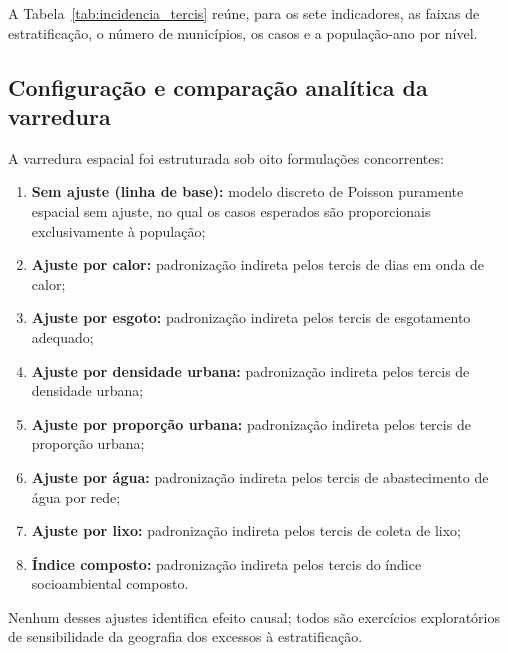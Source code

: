 A Tabela~\ref{tab:incidencia_tercis} reúne, para os sete indicadores, as faixas de estratificação, o número de municípios, os casos e a população-ano por nível.



\subsection{Configuração e comparação analítica da varredura}
\label{subsec:config_satscan}

A varredura espacial foi estruturada sob oito formulações concorrentes:
\begin{enumerate}
    \item \textbf{Sem ajuste (linha de base):} modelo discreto de Poisson puramente espacial sem ajuste, no qual os casos esperados são proporcionais exclusivamente à população;
    \item \textbf{Ajuste por calor:} padronização indireta pelos tercis de dias em onda de calor;
    \item \textbf{Ajuste por esgoto:} padronização indireta pelos tercis de esgotamento adequado;
    \item \textbf{Ajuste por densidade urbana:} padronização indireta pelos tercis de densidade urbana;
    \item \textbf{Ajuste por proporção urbana:} padronização indireta pelos tercis de proporção urbana;
    \item \textbf{Ajuste por água:} padronização indireta pelos tercis de abastecimento de água por rede;
    \item \textbf{Ajuste por lixo:} padronização indireta pelos tercis de coleta de lixo;
    \item \textbf{Índice composto:} padronização indireta pelos tercis do índice socioambiental composto.
\end{enumerate}
Nenhum desses ajustes identifica efeito causal; todos são exercícios exploratórios de sensibilidade da geografia dos excessos à estratificação.

